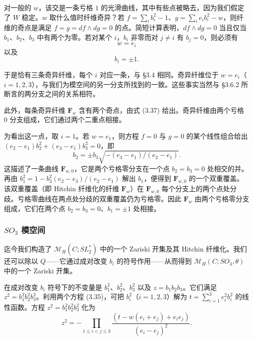对一般的 $w$，该交是一条亏格 $1$ 的光滑曲线，其中有些点被略去，因为我们假定了 $W$ 稳定。$w$ 取什么值时纤维奇异？若 $f=\sum_ib_i^2-1$、$g=\sum_ie_ib_i^2-w$，则纤维的奇点是满足 $f=g=df\wedge dg=0$ 的点。简短计算表明，$df\wedge dg=0$ 当且仅当 $b_1$、$b_2$、$b_3$ 中有两个为零。若对某个 $i$，$b_i$ 非零而对 $j\ne i$ 有 $b_j=0$，则必须有
\begin{equation}\tag{3.36}
w=e_i
\end{equation}
以及
\begin{equation}\tag{3.37}
b_i=\pm1.
\end{equation}

于是恰有三条奇异纤维，每个 $i$ 对应一条，与 §3.4 相同。奇异纤维位于 $w=e_i$（$i=1,2,3$），与我们为模空间的另一分支所找到的一致。这些事实当然与 §3.6.2 所断言的两分支之间的关系相符。

此外，每条奇异纤维 $\boldsymbol{F}_w$ 含有两个奇点，由式 (3.37) 给出。奇异纤维由两个亏格 $0$ 分支组成，它们通过两个二重点相接。


为看出这一点，取 $i=1$。若 $w=e_1$，则方程 $f=0$ 与 $g=0$ 的某个线性组合给出 $(e_2-e_1)b_2^2+(e_3-e_1)b_3^2=0$，即
\begin{equation}\tag{3.38}
b_2=\pm b_3\sqrt{-(e_3-e_1)/(e_2-e_1)}.
\end{equation}
这描述了一条曲线 $\boldsymbol{F}_{w,0}$，它是两个亏格零分支在一个点 $b_2=b_3=0$ 处相交的并。再由 $b_1^2=1-b_3^2(e_2-e_3)/(e_2-e_1)$ 解出 $b_1$，便得到 $\boldsymbol{F}_{w,0}$ 的一个双重覆盖。该双重覆盖（即 Hitchin 纤维化的纤维 $\boldsymbol{F}_w$）在 $\boldsymbol{F}_{w,0}$ 每个分支上的两个点处分歧。亏格零曲线在两点处分歧的双重覆盖仍为亏格零。因此 $\boldsymbol{F}_w$ 由两个亏格零分支组成，它们在两个点 $b_2=b_3=0$、$b_1=\pm1$ 处相接。

\subsubsection{\texorpdfstring{$SO_3$}{SO3} 模空间}

迄今我们构造了 $\mathcal{M}_H(C;SL_2^*)$ 中的一个 Zariski 开集及其 Hitchin 纤维化。我们还可以除以 $Q$——它通过成对改变 $b_i$ 的符号作用——从而得到 $\mathcal{M}_H(C;SO_3,\theta)$ 中的一个 Zariski 开集。

在成对改变 $b_i$ 符号下的不变量是 $b_1^2$、$b_2^2$、$b_3^2$ 以及 $z=b_1b_2b_3$。它们满足 $z^2=b_1^2b_2^2b_3^2$。利用两个方程 (3.35)，可把 $b_i^2$（$i=1,2,3$）解为 $t=\sum_{i=1}^3e_i^2b_i^2$ 的线性函数。方程 $z^2=b_1^2b_2^2b_3^2$ 化为
\begin{equation}\tag{3.39}
z^2=-\prod_{1\le i<j\le3}\frac{(t-w(e_i+e_j)+e_ie_j)}{(e_i-e_j)^2}.
\end{equation}

